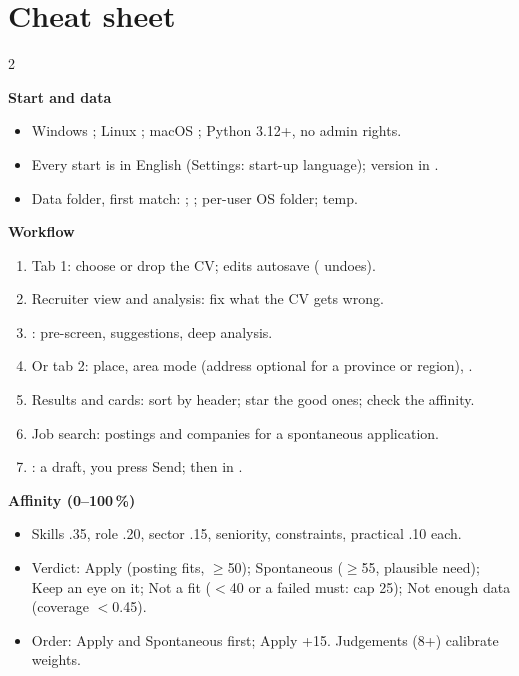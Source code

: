 \chapter*{Cheat sheet}

\begin{multicols}{2}
\small
{}

\textbf{\color{othRed}Start and data}
\begin{itemize}
  \item Windows ; Linux ; macOS ; Python 3.12+, no admin rights.
  \item Every start is in English (Settings: start-up language); version in .
  \item Data folder, first match: ; ; per-user OS folder; temp.
\end{itemize}

\textbf{\color{othRed}Workflow}
\begin{enumerate}[itemsep=0pt, topsep=1pt, leftmargin=1.3em]
  \item Tab 1: choose or drop the CV; edits autosave ( undoes).
  \item Recruiter view and analysis: fix what the CV gets wrong.
  \item {}: pre-screen, suggestions, deep analysis.
  \item Or tab 2: place, area mode (address optional for a province or region), .
  \item Results and cards: sort by header; star the good ones; check the affinity.
  \item Job search: postings and companies for a spontaneous application.
  \item {}: a draft, you press Send; then  in .
\end{enumerate}

\textbf{\color{othRed}Affinity (0--100\,\%)}
\begin{itemize}
  \item Skills .35, role .20, sector .15, seniority, constraints, practical .10 each.
  \item Verdict: Apply (posting fits, $\geq$50); Spontaneous ($\geq$55, plausible need); Keep an eye on it; Not a fit ($<$40 or a failed must: cap 25); Not enough data (coverage $<$0.45).
  \item Order: Apply and Spontaneous first; Apply +15. Judgements (8+) calibrate weights.
\end{itemize}


\end{multicols}

